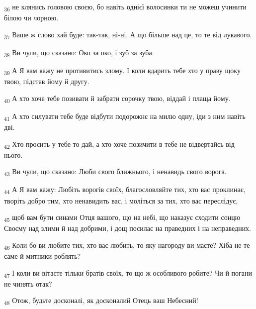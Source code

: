 \begin{tcolorbox}
\textsubscript{36} не клянись головою своєю, бо навіть однієї волосинки ти не можеш учинити білою чи чорною.
\end{tcolorbox}
\begin{tcolorbox}
\textsubscript{37} Ваше ж слово хай буде: так-так, ні-ні. А що більше над це, то те від лукавого.
\end{tcolorbox}
\begin{tcolorbox}
\textsubscript{38} Ви чули, що сказано: Око за око, і зуб за зуба.
\end{tcolorbox}
\begin{tcolorbox}
\textsubscript{39} А Я вам кажу не противитись злому. І коли вдарить тебе хто у праву щоку твою, підстав йому й другу.
\end{tcolorbox}
\begin{tcolorbox}
\textsubscript{40} А хто хоче тебе позивати й забрати сорочку твою, віддай і плаща йому.
\end{tcolorbox}
\begin{tcolorbox}
\textsubscript{41} А хто силувати тебе буде відбути подорожнє на милю одну, іди з ним навіть дві.
\end{tcolorbox}
\begin{tcolorbox}
\textsubscript{42} Хто просить у тебе то дай, а хто хоче позичити в тебе не відвертайсь від нього.
\end{tcolorbox}
\begin{tcolorbox}
\textsubscript{43} Ви чули, що сказано: Люби свого ближнього, і ненавидь свого ворога.
\end{tcolorbox}
\begin{tcolorbox}
\textsubscript{44} А Я вам кажу: Любіть ворогів своїх, благословляйте тих, хто вас проклинає, творіть добро тим, хто ненавидить вас, і моліться за тих, хто вас переслідує,
\end{tcolorbox}
\begin{tcolorbox}
\textsubscript{45} щоб вам бути синами Отця вашого, що на небі, що наказує сходити сонцю Своєму над злими й над добрими, і дощ посилає на праведних і на неправедних.
\end{tcolorbox}
\begin{tcolorbox}
\textsubscript{46} Коли бо ви любите тих, хто вас любить, то яку нагороду ви маєте? Хіба не те саме й митники роблять?
\end{tcolorbox}
\begin{tcolorbox}
\textsubscript{47} І коли ви вітаєте тільки братів своїх, то що ж особливого робите? Чи й погани не чинять отак?
\end{tcolorbox}
\begin{tcolorbox}
\textsubscript{48} Отож, будьте досконалі, як досконалий Отець ваш Небесний!
\end{tcolorbox}

